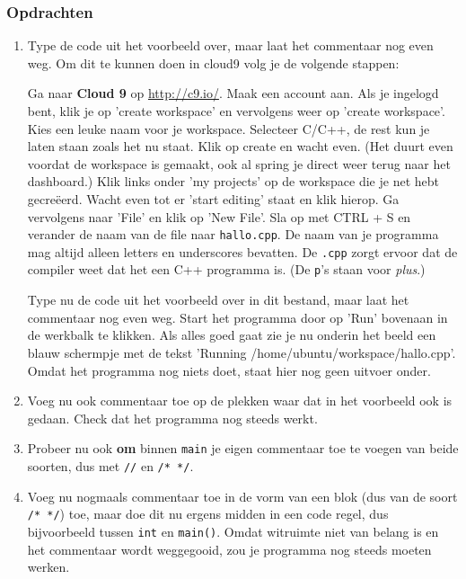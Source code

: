 \documentclass[12pt,a4paper]{article}
\newcommand{\icode}{\lstinline}
\newcommand{\mono}{\texttt}
\begin{document}
\subsubsection{Opdrachten}
\begin{enumerate}
	\item
		Type de code uit het voorbeeld over, maar laat het commentaar nog even weg. Om dit te kunnen doen in cloud9 volg je de volgende stappen:
		
		Ga naar \textbf{Cloud 9} op \url{http://c9.io/}. Maak een account aan. Als je ingelogd bent, klik je op 'create workspace' en vervolgens weer op 'create workspace'. Kies een leuke naam voor je workspace. Selecteer C/C++, de rest kun je laten staan zoals het nu staat. Klik op create en wacht even. (Het duurt even voordat de workspace is gemaakt, ook al spring je direct weer terug naar het dashboard.) Klik links onder 'my projects' op de workspace die je net hebt gecreëerd. Wacht even tot er 'start editing' staat en klik hierop. Ga vervolgens naar 'File' en klik op 'New File'. Sla op met CTRL + S en verander de naam van de file naar \mono{hallo.cpp}. De naam van je programma mag altijd alleen letters en underscores bevatten. De \mono{.cpp} zorgt ervoor dat de compiler weet dat het een C++ programma is. (De \mono{p}'s staan voor \emph{plus}.)
		
		Type nu de code uit het voorbeeld over in dit bestand, maar laat het commentaar nog even weg. Start het programma door op 'Run' bovenaan in de werkbalk te klikken. Als alles goed gaat zie je nu onderin het beeld een blauw schermpje met de tekst 'Running /home/ubuntu/workspace/hallo.cpp'. Omdat het programma nog niets doet, staat hier nog geen uitvoer onder.
	\item
		Voeg nu ook commentaar toe op de plekken waar dat in het voorbeeld ook is gedaan. Check dat het programma nog steeds werkt.
	\item
		Probeer nu ook \textbf{om} binnen \icode{main} je eigen commentaar toe te voegen van beide soorten, dus met \icode{//} en \icode{/* */}.
	\item 
		Voeg nu nogmaals commentaar toe in de vorm van een blok (dus van de soort \icode{/* */}) toe, maar doe dit nu ergens midden in een code regel, dus bijvoorbeeld tussen \icode{int} en \icode{main()}. Omdat witruimte niet van belang is en het commentaar wordt weggegooid, zou je programma nog steeds moeten werken.
\end{enumerate}
\end{document}

